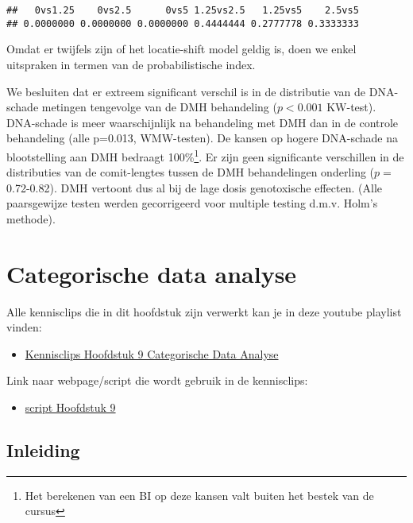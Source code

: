 \documentclass[
  12pt,dutch,coursenotes]{book}
\providecommand{\tightlist}{%
  \setlength{\itemsep}{0pt}\setlength{\parskip}{0pt}}
\theoremstyle{definition}
\theoremstyle{definition}
\theoremstyle{definition}
\theoremstyle{remark}
\begin{document}
\begin{verbatim}
##   0vs1.25    0vs2.5      0vs5 1.25vs2.5   1.25vs5    2.5vs5 
## 0.0000000 0.0000000 0.0000000 0.4444444 0.2777778 0.3333333
\end{verbatim}

Omdat er twijfels zijn of het locatie-shift model geldig is, doen we enkel uitspraken in termen van de probabilistische index.

We besluiten dat er extreem significant verschil is in de distributie van de DNA-schade metingen tengevolge van de DMH behandeling (\(p<0.001\) KW-test).
DNA-schade is meer waarschijnlijk na behandeling met DMH dan in de controle behandeling (alle p=0.013, WMW-testen).
De kansen op hogere DNA-schade na blootstelling aan DMH bedraagt 100\%\footnote{Het berekenen van een BI op deze kansen valt buiten het bestek van de cursus}.
Er zijn geen significante verschillen in de distributies van de comit-lengtes tussen de DMH behandelingen onderling (\(p=\) 0.72-0.82). DMH vertoont dus al bij de lage dosis genotoxische effecten. (Alle paarsgewijze testen werden gecorrigeerd voor multiple testing d.m.v. Holm's methode).

\hypertarget{chap:categorisch}{%
\chapter{Categorische data analyse}\label{chap:categorisch}}

Alle kennisclips die in dit hoofdstuk zijn verwerkt kan je in deze youtube playlist vinden:

\begin{itemize}
\tightlist
\item
  \href{https://www.youtube.com/playlist?list=PLZH1hP8_LbJJnNyz6IMPqq6fCMZJ63y8x}{Kennisclips Hoofdstuk 9 Categorische Data Analyse}
\end{itemize}

Link naar webpage/script die wordt gebruik in de kennisclips:

\begin{itemize}
\tightlist
\item
  \href{https://statomics.github.io/sbc20/rmd/09-categoricalDataAnalysis.html}{script Hoofdstuk 9}
\end{itemize}

\hypertarget{inleiding-8}{%
\section{Inleiding}\label{inleiding-8}}
\end{document}

